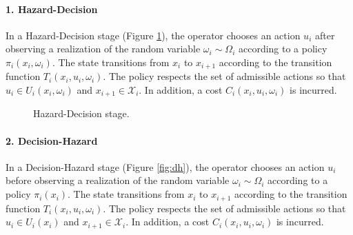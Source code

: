 \documentclass[final,1p,times]{elsarticle}
\begin{document}
\paragraph{1. Hazard-Decision} In a Hazard-Decision stage (Figure \ref{fig:d}), the operator chooses an action $u_i$ after observing a realization of the random variable $\omega_i \sim \Omega_i$ according to a policy $\pi_i(x_i, \omega_i)$. The state transitions from $x_i$ to $x_{i+1}$ according to the transition function $T_i(x_i, u_i, \omega_i)$. The policy respects the set of admissible actions so that $u_i\in U_i(x_i, \omega_i)$ and $x_{i+1}\in \mathcal{X}_i$. In addition, a cost $C_i(x_i, u_i, \omega_i)$ is incurred.

\begin{figure}[!ht]
    \centering
{}
\caption{Hazard-Decision stage.}
\label{fig:d}
\end{figure}

\paragraph{2. Decision-Hazard} In a Decision-Hazard stage (Figure \ref{fig:dh}), the operator chooses an action $u_i$ before observing a realization of the random variable $\omega_i \sim \Omega_i$ according to a policy $\pi_i(x_i)$. The state transitions from $x_i$ to $x_{i+1}$ according to the transition function $T_i(x_i, u_i, \omega_i)$. The policy respects the set of admissible actions so that $u_i\in U_i(x_i)$ and $x_{i+1}\in \mathcal{X}_i$. In addition, a cost $C_i(x_i, u_i, \omega_i)$ is incurred.
\end{document}
